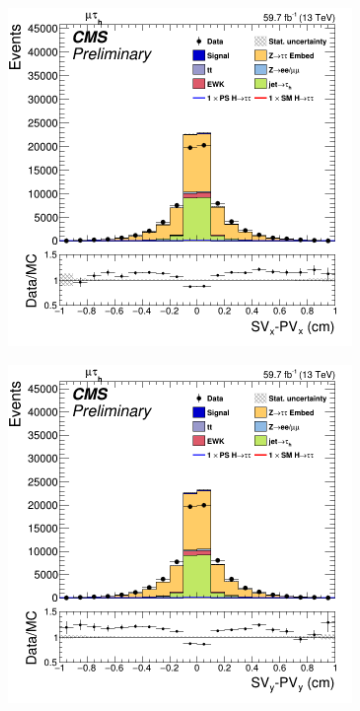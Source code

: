 \begin{figure}
  \begin{subfigure}[b]{0.33\linewidth}
    \centering
    \includegraphics[width=\linewidth]{Chapitre7/Images/TauFlightXztt.png} 
    \caption{} 
    \vspace{0.5ex}
  \end{subfigure}%
  \begin{subfigure}[b]{0.33\linewidth}
    \centering
    \includegraphics[width=\linewidth]{Chapitre7/Images/TauFlightYztt.png} 

\end{subfigure}
\end{figure}
